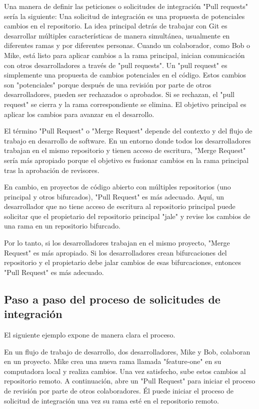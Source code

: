 Una manera de definir las peticiones o solicitudes de integración "Pull requests" sería la siguiente:
Una solicitud de integración es una propuesta de potenciales cambios en el repositorio. La idea principal detrás de trabajar con Git es desarrollar múltiples características de manera simultánea, usualmente en diferentes ramas y por diferentes personas. Cuando un colaborador, como Bob o Mike, está listo para aplicar cambios a la rama principal, inician comunicación con otros desarrolladores a través de "pull requests". Un "pull request" es simplemente una propuesta de cambios potenciales en el código. Estos cambios son "potenciales" porque después de una revisión por parte de otros desarrolladores, pueden ser rechazados o aprobados. Si se rechazan, el "pull request" se cierra y la rama correspondiente se elimina. El objetivo principal es aplicar los cambios para avanzar en el desarrollo.

El término "Pull Request" o "Merge Request" depende del contexto y del flujo de trabajo en desarrollo de software. En un entorno donde todos los desarrolladores trabajan en el mismo repositorio y tienen acceso de escritura, "Merge Request" sería más apropiado porque el objetivo es fusionar cambios en la rama principal tras la aprobación de revisores.

En cambio, en proyectos de código abierto con múltiples repositorios (uno principal y otros bifurcados), "Pull Request" es más adecuado. Aquí, un desarrollador que no tiene acceso de escritura al repositorio principal puede solicitar que el propietario del repositorio principal "jale" y revise los cambios de una rama en un repositorio bifurcado.

Por lo tanto, si los desarrolladores trabajan en el mismo proyecto, "Merge Request" es más apropiado. Si los desarrolladores crean bifurcaciones del repositorio y el propietario debe jalar cambios de esas bifurcaciones, entonces "Pull Request" es más adecuado.

\subsection{Paso a paso del proceso de solicitudes de integración}

El siguiente ejemplo expone de manera clara el proceso.

En un flujo de trabajo de desarrollo, dos desarrolladores, Mike y Bob, colaboran en un proyecto. Mike crea una nueva rama llamada "feature-one" en su computadora local y realiza cambios. Una vez satisfecho, sube estos cambios al repositorio remoto. A continuación, abre un "Pull Request" para iniciar el proceso de revisión por parte de otros colaboradores. Él puede iniciar el proceso de solicitud de integración una vez su rama esté en el repositorio remoto.

